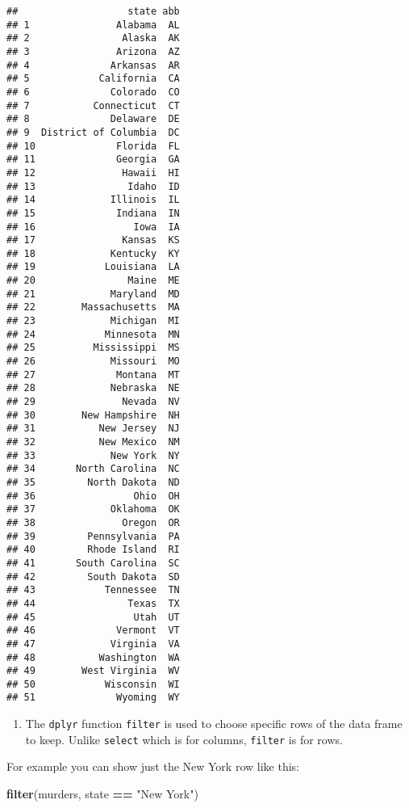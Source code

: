 \documentclass[]{article}
\newenvironment{Shaded}{\begin{snugshade}}{\end{snugshade}}
\newcommand{\KeywordTok}[1]{\textcolor[rgb]{0.13,0.29,0.53}{\textbf{#1}}}
\newcommand{\NormalTok}[1]{#1}
\newcommand{\OperatorTok}[1]{\textcolor[rgb]{0.81,0.36,0.00}{\textbf{#1}}}
\newcommand{\StringTok}[1]{\textcolor[rgb]{0.31,0.60,0.02}{#1}}
\providecommand{\tightlist}{%
  \setlength{\itemsep}{0pt}\setlength{\parskip}{0pt}}
\begin{document}
\begin{verbatim}
##                   state abb
## 1               Alabama  AL
## 2                Alaska  AK
## 3               Arizona  AZ
## 4              Arkansas  AR
## 5            California  CA
## 6              Colorado  CO
## 7           Connecticut  CT
## 8              Delaware  DE
## 9  District of Columbia  DC
## 10              Florida  FL
## 11              Georgia  GA
## 12               Hawaii  HI
## 13                Idaho  ID
## 14             Illinois  IL
## 15              Indiana  IN
## 16                 Iowa  IA
## 17               Kansas  KS
## 18             Kentucky  KY
## 19            Louisiana  LA
## 20                Maine  ME
## 21             Maryland  MD
## 22        Massachusetts  MA
## 23             Michigan  MI
## 24            Minnesota  MN
## 25          Mississippi  MS
## 26             Missouri  MO
## 27              Montana  MT
## 28             Nebraska  NE
## 29               Nevada  NV
## 30        New Hampshire  NH
## 31           New Jersey  NJ
## 32           New Mexico  NM
## 33             New York  NY
## 34       North Carolina  NC
## 35         North Dakota  ND
## 36                 Ohio  OH
## 37             Oklahoma  OK
## 38               Oregon  OR
## 39         Pennsylvania  PA
## 40         Rhode Island  RI
## 41       South Carolina  SC
## 42         South Dakota  SD
## 43            Tennessee  TN
## 44                Texas  TX
## 45                 Utah  UT
## 46              Vermont  VT
## 47             Virginia  VA
## 48           Washington  WA
## 49        West Virginia  WV
## 50            Wisconsin  WI
## 51              Wyoming  WY
\end{verbatim}

\begin{enumerate}
\def\labelenumi{\arabic{enumi}.}
\setcounter{enumi}{3}
\tightlist
\item
  The \texttt{dplyr} function \texttt{filter} is used to choose specific
  rows of the data frame to keep. Unlike \texttt{select} which is for
  columns, \texttt{filter} is for rows.
\end{enumerate}

For example you can show just the New York row like this:

\begin{Shaded}
\begin{Highlighting}[]
\KeywordTok{filter}\NormalTok{(murders, state }\OperatorTok{==}\StringTok{ "New York"}\NormalTok{)}
\end{Highlighting}
\end{Shaded}
\end{document}
